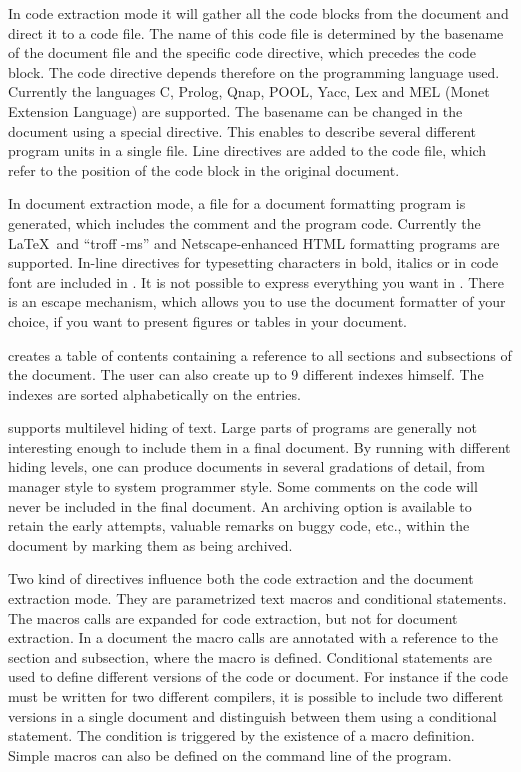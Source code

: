 \documentclass{article}
\begin{document}
In code extraction mode it will gather all the code blocks from the
\Mx document and direct it to a code file. The name of this code file
is determined by the basename of the \Mx document file and the specific
code directive, which precedes the code block. The code directive
depends therefore on the programming language used. Currently the
languages  C, Prolog, Qnap, POOL, Yacc, Lex and MEL (Monet Extension Language)
are supported.
The basename can be changed in the \Mx document using a special
directive. This enables to describe several different program units in
a single \Mx file. Line directives are added to the code file, 
which refer to the position of the code block in the original \Mx document. 

In document extraction mode, a file for a document formatting program
is generated, which includes the comment and the program code.
Currently the \LaTeX\ and ``troff -ms'' and Netscape-enhanced HTML 
formatting programs are supported. 
In-line directives for typesetting characters in bold,
italics or in code font are included in \Mx. It is not possible to
express everything you want in \Mx. There is an escape mechanism,
which allows you to use the document formatter of your choice, if you
want to present figures or tables in your document.

\Mx creates a table of contents containing a reference to all sections
and subsections of the document. The user can also create up to 9
different indexes himself. The indexes are sorted
alphabetically on the entries.

\Mx supports multilevel hiding of text. Large parts of
programs are generally not interesting enough to include them in a
final document. By running \Mx with different
hiding levels, one can produce documents in several gradations of
detail, from manager style to system programmer style.
Some comments on the code will never be included in the final
document. An archiving option is available to retain the early
attempts, valuable remarks on buggy code, etc.,  
within the \Mx document by marking them as being archived.

Two kind of directives influence both the code extraction and the
document extraction mode. They are parametrized text macros and 
conditional statements. The macros calls are expanded for code extraction,
but not for document extraction. In a document the macro calls are
annotated with a reference to the section and subsection, where
the macro is defined.
Conditional statements are used to define different versions of the
code or document. For instance if the code must be written for two
different compilers, it is possible to include two different versions
in a single document and distinguish between them using a conditional
statement. The condition is triggered by the existence of a macro
definition. Simple macros can also be defined on the command line of
the \Mx program. 
\end{document}
